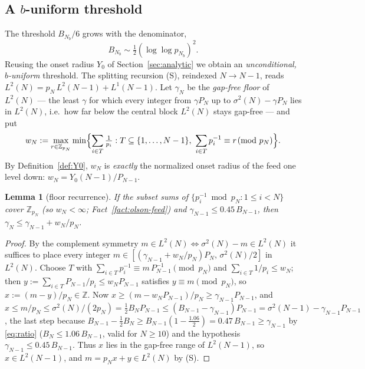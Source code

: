 \documentclass[11pt]{amsart}
\theoremstyle{plain}
\newtheorem{lemma}[theorem]{Lemma}
\theoremstyle{definition}
\newcommand{\Z}{\mathbb{Z}}
\begin{document}
\subsection{A \texorpdfstring{$b$}{b}-uniform threshold}
The threshold $B_{N_b}/6$ grows with the denominator,
\[
  B_{N_b}\sim\tfrac12(\log\log p_{N_b})^2 .
\]
Reusing the onset radius $Y_0$ of
Section~\ref{sec:analytic} we obtain an \emph{unconditional, $b$-uniform}
threshold.  The splitting recursion \textup{(S)}, reindexed $N\to N-1$, reads
$L^2(N)=p_N\,L^2(N-1)+L^1(N-1)$.  Let $\gamma_N$ be the \emph{gap-free floor} of
$L^2(N)$ --- the least $\gamma$ for which every integer from $\gamma P_N$ up to
$\sigma^2(N)-\gamma P_N$ lies in $L^2(N)$, i.e.\ how far below the central block
$L^2(N)$ stays gap-free --- and put
\begin{equation}\label{eq:wmin}
  w_N:=\max_{r\in\Z_{p_N}}\min\Bigl\{\sum_{i\in T}\tfrac1{p_i}:
  T\subseteq\{1,\dots,N-1\},\ \sum_{i\in T}p_i^{-1}\equiv r\!\!\pmod{p_N}\Bigr\}.
\end{equation}
By Definition~\ref{def:Y0}, $w_N$ is \emph{exactly} the normalized onset radius of
the feed one level down: $w_N=Y_0(N-1)/P_{N-1}$.

\begin{lemma}[floor recurrence]\label{lem:floorrec}
If the subset sums of $\{p_i^{-1}\bmod p_N:1\le i<N\}$ cover $\Z_{p_N}$ (so
$w_N<\infty$; Fact~\ref{fact:olson-feed}) and $\gamma_{N-1}\le 0.45\,B_{N-1}$, then
$\gamma_N\le\gamma_{N-1}+w_N/p_N$.
\end{lemma}

\begin{proof}
By the complement symmetry $m\in L^2(N)\Leftrightarrow\sigma^2(N)-m\in L^2(N)$ it
suffices to place every integer
$m\in[(\gamma_{N-1}+w_N/p_N)P_N,\,\sigma^2(N)/2]$ in $L^2(N)$.  Choose $T$ with
$\sum_{i\in T}p_i^{-1}\equiv m\,P_{N-1}^{-1}\pmod{p_N}$ and
$\sum_{i\in T}1/p_i\le w_N$; then $y:=\sum_{i\in T}P_{N-1}/p_i\le w_NP_{N-1}$
satisfies $y\equiv m\pmod{p_N}$, so $x:=(m-y)/p_N\in\Z$.  Now
$x\ge(m-w_NP_{N-1})/p_N\ge\gamma_{N-1}P_{N-1}$, and
$x\le m/p_N\le\sigma^2(N)/(2p_N)=\tfrac12 B_NP_{N-1}\le(B_{N-1}-\gamma_{N-1})P_{N-1}
=\sigma^2(N-1)-\gamma_{N-1}P_{N-1}$, the last step because $B_{N-1}-\tfrac12 B_N\ge
B_{N-1}(1-\tfrac{1.06}2)=0.47\,B_{N-1}\ge\gamma_{N-1}$ by \eqref{eq:ratio}
($B_N\le1.06\,B_{N-1}$, valid for $N\ge10$) and the hypothesis
$\gamma_{N-1}\le0.45\,B_{N-1}$.  Thus $x$ lies in the
gap-free range of $L^2(N-1)$, so $x\in L^2(N-1)$, and $m=p_Nx+y\in L^2(N)$ by
\textup{(S)}.
\end{proof}
\end{document}
